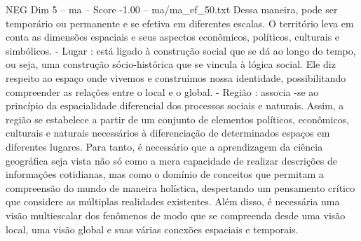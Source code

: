 \begin{textsample}{NEG Dim 5 – ma – Score -1.00 – ma/ma\_ef\_50.txt}
Dessa maneira, pode ser temporário ou permanente e se efetiva em diferentes escalas.
O território leva em conta as dimensões espaciais e seus aspectos econômicos, políticos, culturais e simbólicos. - Lugar : está ligado à construção social que se dá ao longo do tempo, ou seja, uma construção sócio-histórica que se vincula à lógica social.
Ele diz respeito ao espaço onde vivemos e construímos nossa identidade, possibilitando compreender as relações entre o local e o global. - Região : associa -se ao princípio da espacialidade diferencial dos processos sociais e naturais.
Assim, a região se estabelece a partir de um conjunto de elementos políticos, econômicos, culturais e naturais necessários à diferenciação de determinados espaços em diferentes lugares.
Para tanto, é necessário que a aprendizagem da ciência geográfica seja vista não só como a mera capacidade de realizar descrições de informações cotidianas, mas como o domínio de conceitos que permitam a compreensão do mundo de maneira holística, despertando um pensamento crítico que considere as múltiplas realidades existentes.
Além disso, é necessária uma visão multiescalar dos fenômenos de modo que se compreenda desde uma visão local, uma visão global e suas várias conexões espaciais e temporais.

\end{textsample}
